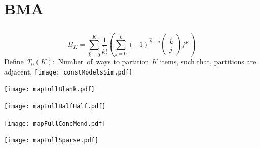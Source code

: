 \documentclass[ xcolor = pdftex, dvipsnames, table ]{beamer}
\begin{document}
\section{BMA}
\subsection{}
\begin{frame}{}%
\begin{equation*}
B_K=\sum_{\hat k=0}^{K} \frac{1}{\hat k!} \left( \sum_{j=0}^{\hat k} (-1)^{\hat k -j} \left(\substack{\hat k \\ j}\right) j^K \right)
\end{equation*}
\mbox{Define $T_0(K)$: Number of ways} to partition $K$ items, such that, partitions are adjacent.
\texttt{[image: constModelsSim.pdf]}
\hspace{0.5cm}
\begin{minipage}[h!]{0.2\textwidth}
        \hspace*{-0.5cm}
        \texttt{[image: mapFullBlank.pdf]}
\end{minipage}
\begin{minipage}[h!]{0.2\textwidth}
        \hspace*{-0.25cm}
        \texttt{[image: mapFullHalfHalf.pdf]}
\end{minipage}
\begin{minipage}[h!]{0.2\textwidth}
        \hspace*{0.25cm}
        \texttt{[image: mapFullConcMend.pdf]}
\end{minipage}
\begin{minipage}[h!]{0.2\textwidth}
        \hspace*{0.5cm}                %
        \texttt{[image: mapFullSparse.pdf]}
\end{minipage}
\end{frame}

%
%
\end{document}
